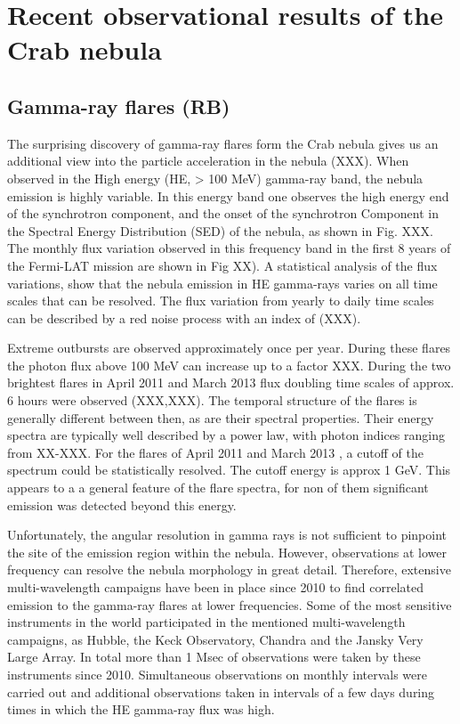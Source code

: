 \section{Recent observational results of the Crab nebula}
\subsection{Gamma-ray flares (RB)}

The surprising discovery of gamma-ray flares form the Crab nebula gives us an additional view into the particle acceleration in the nebula (XXX). When observed in the High energy (HE, > 100 MeV) gamma-ray band, the nebula emission is highly variable. In this energy band one observes the high energy end of the synchrotron component, and the onset of the synchrotron Component in the Spectral Energy Distribution (SED) of the nebula, as shown in Fig. XXX. The monthly flux variation observed in this frequency band in the first 8 years of the Fermi-LAT mission are shown in Fig XX). A statistical analysis of the flux variations, show that the nebula emission in HE gamma-rays varies on all time scales that can be resolved. The flux variation from yearly to daily time scales can be described by a red noise process with an index of (XXX).

Extreme outbursts are observed approximately once per year. During these flares the photon flux above 100 MeV can increase up to a factor XXX. During the two brightest flares in April 2011 and March 2013 flux doubling time scales of approx. 6 hours were observed (XXX,XXX). The temporal structure of the flares is generally different between then, as are their spectral properties. Their energy spectra are typically well described by a power law, with photon indices ranging from XX-XXX. For the flares of April 2011 and March 2013 , a cutoff of the spectrum could be statistically resolved. The cutoff energy is approx 1 GeV. This appears to a a general feature of the flare spectra, for non of them significant emission was detected beyond this energy.

Unfortunately, the angular resolution in gamma rays is not sufficient to pinpoint the site of the emission region within the nebula. However, observations at lower frequency can resolve the nebula morphology in great detail. Therefore, extensive multi-wavelength campaigns have been in place since 2010 to find correlated emission to the gamma-ray flares at lower frequencies. Some of the most sensitive instruments in the world participated in the mentioned multi-wavelength campaigns, as Hubble, the Keck Observatory, Chandra and the Jansky Very Large Array. In total more than 1 Msec of observations were taken by these  instruments since 2010. Simultaneous observations on monthly intervals were carried out and additional observations taken in intervals of a few days during times in which the HE gamma-ray flux was high. 

